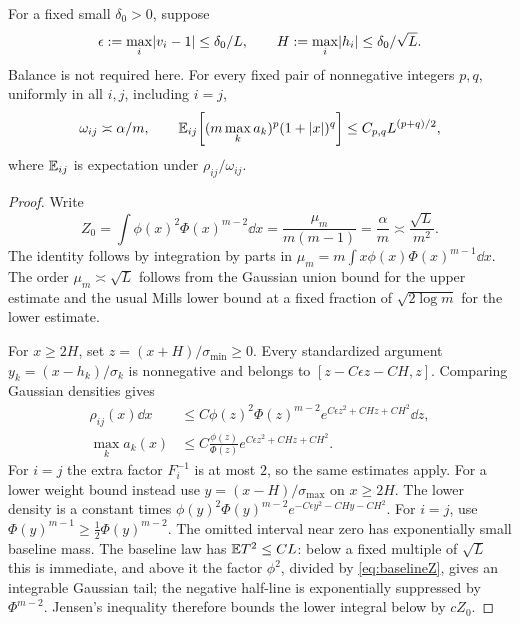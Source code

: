 \begin{lemma}\label{lem:threshold}
For a fixed small $\delta_0>0$, suppose
\begin{equation}\label{eq:thresholdbox}
 \epsilon:=\max_i\lvert v_i-1\rvert\le\delta_0/L,
 \qquad H:=\max_i\lvert h_i\rvert\le\delta_0/\sqrt L.
\end{equation}
Balance is not required here. For every fixed pair of nonnegative
integers $p,q$, uniformly in all $i,j$, including $i=j$,
\begin{equation}\label{eq:thresholdmoments}
 \omega_{ij}\asymp\alpha/m,\qquad
 \mathbb E_{ij}\!\left[(m\max_k a_k)^p(1+\lvert x\rvert)^q\right]
                    \le C_{p,q}L^{(p+q)/2},
\end{equation}
where $\mathbb E_{ij}$ is expectation under $\rho_{ij}/\omega_{ij}$.
\end{lemma}
\begin{proof}
Write
\begin{equation}\label{eq:baselineZ}
 Z_0=\int\phi(x)^2\Phi(x)^{m-2}\dd x
              =\frac{\mu_m}{m(m-1)}=\frac\alpha m
              \asymp\frac{\sqrt L}{m^2}.
\end{equation}
The identity follows by integration by parts in
$\mu_m=m\int x\phi(x)\Phi(x)^{m-1}\dd x$. The order
$\mu_m\asymp\sqrt L$ follows from the Gaussian union bound for the
upper estimate and the usual Mills lower bound at a fixed fraction of
$\sqrt{2\log m}$ for the lower estimate.

For $x\ge2H$, set $z=(x+H)/\sigma_{\min}\ge0$. Every standardized
argument $y_k=(x-h_k)/\sigma_k$ is nonnegative and belongs to
$[z-C\epsilon z-CH,z]$. Comparing Gaussian densities gives
\begin{align}
 \rho_{ij}(x)\dd x
 &\le C\phi(z)^2\Phi(z)^{m-2}
       e^{C\epsilon z^2+CHz+CH^2}\dd z,\label{eq:thresholdupper}\\
 \max_k a_k(x)&\le C\frac{\phi(z)}{\Phi(z)}
       e^{C\epsilon z^2+CHz+CH^2}.
 \label{eq:hazardupper}
\end{align}
For $i=j$ the extra factor $F_i^{-1}$ is at most $2$, so the same
estimates apply. For a lower weight bound instead use
$y=(x-H)/\sigma_{\max}$ on $x\ge2H$. The lower density is a constant
times $\phi(y)^2\Phi(y)^{m-2}e^{-C\epsilon y^2-CHy-CH^2}$.
For $i=j$, use $\Phi(y)^{m-1}\ge\frac12\Phi(y)^{m-2}$.
The omitted interval near zero has exponentially small baseline mass.
The baseline law has $\mathbb E T^2\le CL$: below a fixed multiple of
$\sqrt L$ this is immediate, and above it the factor $\phi^2$,
divided by \eqref{eq:baselineZ}, gives an integrable Gaussian tail;
the negative half-line is exponentially suppressed by $\Phi^{m-2}$.
Jensen's inequality therefore bounds the lower integral below by $cZ_0$.


\end{proof}
